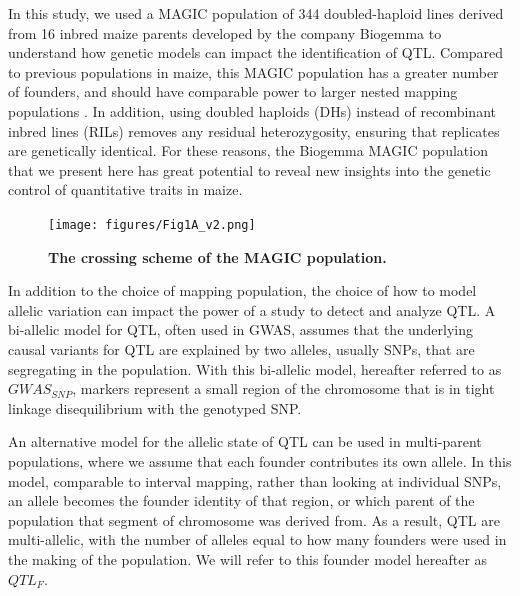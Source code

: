 \documentclass[9pt,twocolumn,twoside]{gsag3jnl}
\begin{document}
In this study, we used a MAGIC population of 344 doubled-haploid lines derived from 16 inbred maize parents developed by the company Biogemma to understand how genetic models can impact the identification of QTL.
Compared to previous populations in maize, this MAGIC population has a greater number of founders, and should have comparable power to larger nested mapping  populations \citep{DellAcqua,Yu2}. In addition, using doubled haploids (DHs) instead of recombinant inbred lines (RILs) removes any residual heterozygosity, ensuring that replicates are genetically identical.
For these reasons, the Biogemma MAGIC population that we present here has great potential to reveal new insights into the genetic control of quantitative traits in maize.

\begin{figure}[ht!]
\centering
\texttt{[image: figures/Fig1A\_v2.png]}
\caption{\textbf{The crossing scheme of the MAGIC population.}}
\label{fig:figure1a}
\end{figure}

In addition to the choice of mapping population, the choice of how to model allelic variation can impact the power of a study to detect and analyze QTL.
A bi-allelic model for QTL, often used in GWAS, assumes that the underlying causal variants for QTL are explained by two alleles, usually SNPs, that are segregating in the population.
With this bi-allelic model, hereafter referred to as $GWAS_{SNP}$, markers represent a small region of the chromosome that is in tight linkage disequilibrium with the genotyped SNP.

An alternative model for the allelic state of QTL can be used in multi-parent populations, where we assume that each founder contributes its own allele.
In this model, comparable to interval mapping, rather than looking at individual SNPs, an allele becomes the founder identity of that region, or which parent of the population that segment of chromosome was derived from.
As a result, QTL are multi-allelic, with the number of alleles equal to how many founders were used in the making of the population.
We will refer to this founder model hereafter as $QTL_F$.
\end{document}
